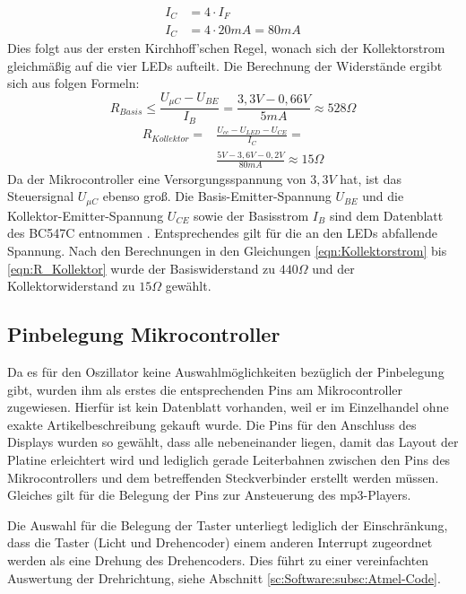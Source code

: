 \documentclass[journal, a4paper]{IEEEtran}
\begin{document}
		\begin{subequations}
			\label{eqn:Kollektorstrom}
			\begin{align}
				I_C & = 4 \cdot I_F\\
				I_C & = 4 \cdot 20mA = 80mA
			\end{align}
		\end{subequations}
	  Dies folgt aus der ersten Kirchhoff'schen Regel, wonach sich der Kollektorstrom gleichmäßig auf die vier LEDs aufteilt. Die Berechnung der Widerstände ergibt sich aus folgen Formeln: 
		\begin{equation}
			\label{eqn:R_Basis}
			R_{Basis} \leq \frac{U_{\mu C}-U_{BE}}{I_B} =  \frac{3,3V-0,66V}{5mA} \approx 528\Omega
		\end{equation}
		\begin{equation}
			\label{eqn:R_Kollektor}
			\begin{split}
				R_{Kollektor} = & \frac{U_{cc}-U_{LED}-U_{CE}}{I_{C}} = \\ 
				&\frac{5V-3,6V-0,2V}{80mA} \approx 15\Omega
			\end{split}
		\end{equation}
		Da der Mikrocontroller eine Versorgungsspannung von $3,3V$ hat, ist das Steuersignal $U_{\mu C}$ ebenso groß. Die Basis-Emitter-Spannung $U_{BE}$ und die Kollektor-Emitter-Spannung $U_{CE}$ sowie der Basisstrom $I_B$ sind dem Datenblatt des BC547C entnommen \cite{BC547C}. Entsprechendes gilt für die an den LEDs abfallende Spannung. Nach den Berechnungen in den Gleichungen \eqref{eqn:Kollektorstrom} bis \eqref{eqn:R_Kollektor} wurde der Basiswiderstand zu $440\Omega$ und der Kollektorwiderstand zu  $15\Omega$ gewählt.

	
	\subsection{Pinbelegung Mikrocontroller}
		\label{sc:Hardware:subsc:Pinbelegung}
		Da es für den Oszillator keine Auswahlmöglichkeiten bezüglich der Pinbelegung gibt, wurden ihm als erstes die entsprechenden Pins am Mikrocontroller zugewiesen. Hierfür ist kein Datenblatt vorhanden, weil er im Einzelhandel ohne exakte Artikelbeschreibung gekauft wurde. Die Pins für den Anschluss des Displays wurden so gewählt, dass alle nebeneinander liegen, damit das Layout der Platine erleichtert wird und lediglich gerade Leiterbahnen zwischen den Pins des Mikrocontrollers und dem betreffenden Steckverbinder erstellt werden müssen. Gleiches gilt für die Belegung der Pins zur Ansteuerung des mp3-Players.\par
		Die Auswahl für die Belegung der Taster unterliegt lediglich der Einschränkung, dass die Taster (Licht und Drehencoder) einem anderen Interrupt zugeordnet werden als eine Drehung des Drehencoders. Dies führt zu einer vereinfachten Auswertung der Drehrichtung, siehe Abschnitt \ref{sc:Software:subsc:Atmel-Code}.
	
\end{document}
